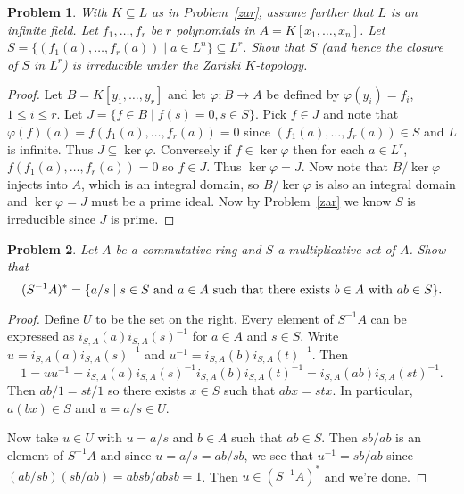 \documentclass{article}
\newtheorem{problem}{Problem}
\begin{document}
\begin{problem}
With $K \subseteq L$ as in Problem~\ref{zar}, assume further that $L$ is an infinite field. Let $f_1, \dots , f_r$ be $r$ polynomials in $A = K[x_1, \dots , x_n]$. Let $S = \{(f_1(a), \dots , f_r(a)) \mid a \in L^n\} \subseteq L^r$. Show that $S$ (and hence the closure of $S$ in $L^r$) is irreducible under the Zariski $K$-topology.
\end{problem}
\begin{proof}
Let $B = K[y_1, \dots , y_r]$ and let $\varphi : B \to A$ be defined by $\varphi(y_i) = f_i$, $1 \leq i \leq r$. Let $J = \{f \in B \mid f(s) = 0, s \in S\}$. Pick $f \in J$ and note that $\varphi(f)(a) = f(f_1(a), \dots , f_r(a)) = 0$ since $(f_1(a), \dots , f_r(a)) \in S$ and $L$ is infinite. Thus $J \subseteq \ker \varphi$. Conversely if $f \in \ker \varphi$ then for each $a \in L^r$, $f(f_1(a), \dots , f_r(a)) = 0$ so $f \in J$. Thus $\ker \varphi = J$. Now note that $B/\ker \varphi$ injects into $A$, which is an integral domain, so $B/\ker \varphi$ is also an integral domain and $\ker \varphi = J$ must be a prime ideal. Now by Problem~\ref{zar} we know $S$ is irreducible since $J$ is prime.
\end{proof}

\begin{problem}
\label{multunits}
Let $A$ be a commutative ring and $S$ a multiplicative set of $A$. Show that
\[
(S^{-1}A)^* = \{a/s \mid \textup{$s \in S$ and $a \in A$ such that there exists $b \in A$ with $ab \in S$}\}.
\]
\end{problem}
\begin{proof}
Define $U$ to be the set on the right. Every element of $S^{-1}A$ can be expressed as $i_{S,A}(a)i_{S,A}(s)^{-1}$ for $a \in A$ and $s \in S$. Write $u = i_{S,A}(a) i_{S,A}(s)^{-1}$ and $u^{-1} = i_{S,A}(b) i_{S,A}(t)^{-1}$. Then
\[
1 = uu^{-1} = i_{S,A}(a) i_{S,A}(s)^{-1} i_{S,A}(b) i_{S,A}(t)^{-1} = i_{S,A}(ab) i_{S,A}(st)^{-1}.
\]
Then $ab/1 = st/1$ so there exists $x \in S$ such that $abx = stx$. In particular, $a(bx) \in S$ and $u = a/s \in U$.

Now take $u \in U$ with $u = a/s$ and $b \in A$ such that $ab \in S$. Then $sb/ab$ is an element of $S^{-1}A$ and since $u = a/s = ab/sb$, we see that $u^{-1} = sb/ab$ since $(ab/sb)(sb/ab) = absb/absb = 1$. Then $u \in (S^{-1}A)^*$ and we're done.
\end{proof}
\end{document}
